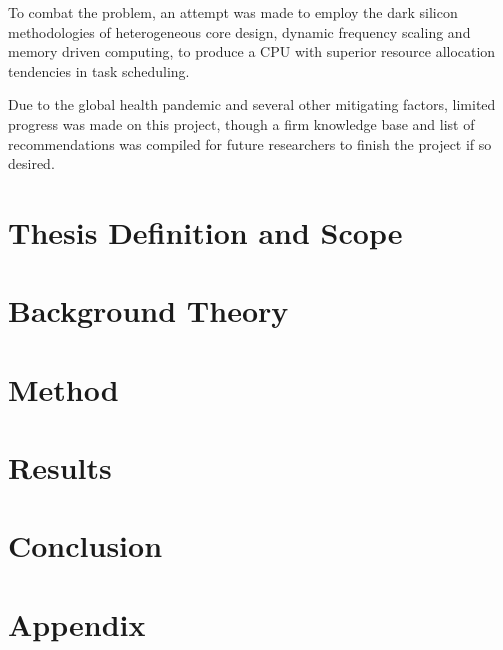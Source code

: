 \documentclass[a4paper,12pt]{report}
\begin{document}
	To combat the problem, an attempt was made to employ the dark silicon methodologies of heterogeneous core design, dynamic frequency scaling and memory driven computing, to produce a CPU with superior resource allocation tendencies in task scheduling.
	
	Due to the global health pandemic and several other mitigating factors, limited progress was made on this project, though a firm knowledge base and list of recommendations was compiled for future researchers to finish the project if so desired.

	\leavevmode\thispagestyle{empty}\newpage
	
	\thispagestyle{empty}
	\tableofcontents
	\thispagestyle{empty}
	\listoffigures
	\thispagestyle{empty}
	\leavevmode\thispagestyle{empty}\newpage
	
	\leavevmode\thispagestyle{empty}\newpage
	
	\cleardoublepage{}
	
	
	\chapter{Thesis Definition and Scope}
	

	\leavevmode\thispagestyle{empty}\newpage
	\leavevmode\thispagestyle{empty}\newpage

	\chapter{Background Theory}
	
	
	
	\leavevmode\thispagestyle{empty}\newpage
	
	\leavevmode\thispagestyle{empty}\newpage
	
	\chapter{Method}
	
	
	\chapter{Results}
	
	
	\chapter{Conclusion}
	
	
	\appendix
	\chapter{Appendix}
%	

	\printbibliography
\end{document}
